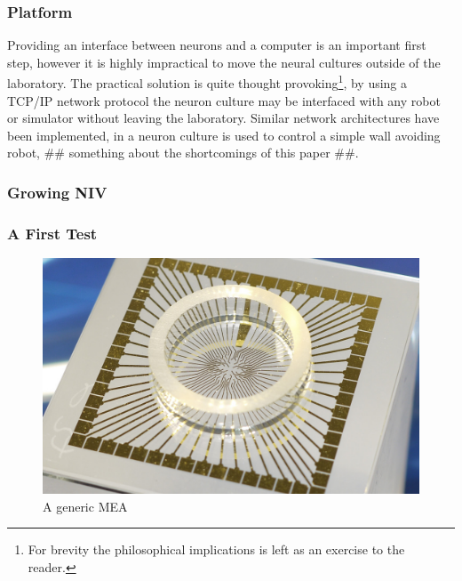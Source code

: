 \subsubsection{Platform}
Providing an interface between neurons and a computer is an important first
step, however it is highly impractical to move the neural cultures outside of
the laboratory.
The practical solution is quite thought provoking\footnote{For brevity the
  philosophical implications is left as an exercise to the reader.},
by using a TCP/IP network protocol the neuron culture may be interfaced with any
robot or simulator without leaving the laboratory. 
Similar network architectures have been implemented, in
\cite{li_application_2015} a neuron culture is used to control a simple wall
avoiding robot, \#\# something about the shortcomings of this paper \#\#.
\subsubsection{Growing NIV}

\subsubsection{A First Test}
\begin{figure}[h!]
    \includegraphics[width=\linewidth]{images/MEA.jpg}
    \caption{A generic MEA}
    \label{fig:generic_MEA}
\end{figure}

